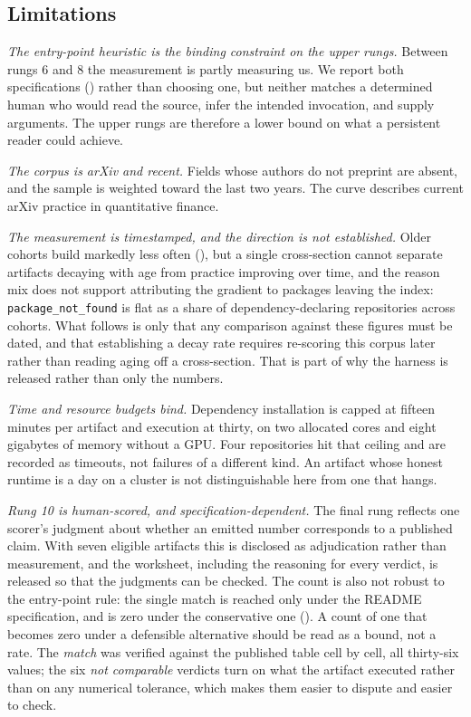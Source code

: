 \subsection{Limitations}\label{sec:limitations}

\emph{The entry-point heuristic is the binding constraint on the upper rungs.}
Between rungs 6 and 8 the measurement is partly measuring us. We report both
specifications () rather than choosing one, but neither
matches a determined human who would read the source, infer the intended
invocation, and supply arguments. The upper rungs are therefore a lower bound on
what a persistent reader could achieve.

\emph{The corpus is arXiv and recent.} Fields whose authors do not preprint are
absent, and the sample is weighted toward the last two years. The curve describes
current arXiv practice in quantitative finance.

\emph{The measurement is timestamped, and the direction is not established.}
Older cohorts build markedly less often (), but a single
cross-section cannot separate artifacts decaying with age from practice improving
over time, and the reason mix does not support attributing the gradient to
packages leaving the index: \texttt{package\_not\_found} is flat as a share of
dependency-declaring repositories across cohorts. What follows is only that any
comparison against these figures must be dated, and that establishing a decay
rate requires re-scoring this corpus later rather than reading aging off a
cross-section. That is part of why the harness is released rather than only the
numbers.

\emph{Time and resource budgets bind.} Dependency installation is capped at
fifteen minutes per artifact and execution at thirty, on two allocated cores and
eight gigabytes of memory
without a GPU. Four repositories hit that ceiling
and are recorded as timeouts, not failures of a different kind. An artifact whose
honest runtime is a day on a cluster is not distinguishable here from one that
hangs.

\emph{Rung 10 is human-scored, and specification-dependent.} The final rung
reflects one scorer's judgment about whether an emitted number corresponds to a
published claim. With seven eligible artifacts this is disclosed as adjudication
rather than measurement, and the worksheet, including the reasoning for every
verdict, is released so that the judgments can be checked. The count is also not
robust to the entry-point rule: the single match is reached only under the
README specification, and is zero under the conservative one
(). A count of one that becomes zero under a defensible
alternative should be read as a bound, not a rate. The \emph{match} was verified against the published
table cell by cell, all thirty-six values; the six \emph{not comparable} verdicts
turn on what the artifact executed rather than on any numerical tolerance, which
makes them easier to dispute and easier to check.

